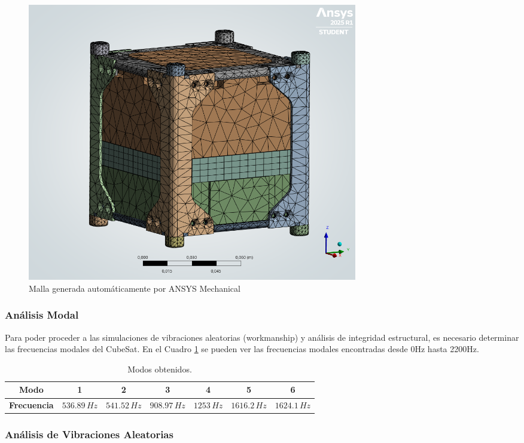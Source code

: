       \begin{figure}[H]
        \centering
        \includegraphics[width=0.7\textwidth]{image/fem/ansys_cubesat-mesh.png}
        \caption{Malla generada automáticamente por ANSYS Mechanical}
        \label{fig:fem_mesh}
      \end{figure}

    \subsubsection{Análisis Modal}

      Para poder proceder a las simulaciones de vibraciones aleatorias (workmanship) y análisis de integridad
      estructural, es necesario determinar las frecuencias modales del CubeSat. En el Cuadro \ref{tab:modos_obtenidos}
      se pueden ver las frecuencias modales encontradas desde 0Hz hasta 2200Hz.

      \begin{table}[H]
      \centering
      \begin{tabular}{|c|c|c|c|c|c|c|}
      \hline
      \textbf{Modo}       & 1           & 2           & 3           & 4         & 5           & 6          \\
      \hline
      \textbf{Frecuencia} & $536.89\,Hz$ & $541.52\,Hz$ & $908.97\,Hz$ & $1253\,Hz$ & $1616.2\,Hz$ & $1624.1\,Hz$ \\
      \hline
      \end{tabular}
      \caption{Modos obtenidos.}
      \label{tab:modos_obtenidos}
      \end{table}

    \subsubsection{Análisis de Vibraciones Aleatorias}

